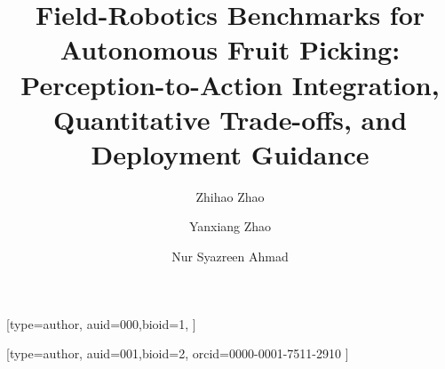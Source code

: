 \documentclass[a4paper,fleqn]{cas-dc}
\begin{document}


\title [mode = title]{Field-Robotics Benchmarks for Autonomous Fruit Picking: Perception-to-Action Integration, Quantitative Trade-offs, and Deployment Guidance}    




\author[1,2]{Zhihao Zhao}[type=author, 
                        auid=000,bioid=1,
                        ]


\author[3]{Yanxiang Zhao}
\author[1]{Nur Syazreen Ahmad}[type=author, 
                        auid=001,bioid=2,
                        orcid=0000-0001-7511-2910
                        ]
\end{document}
